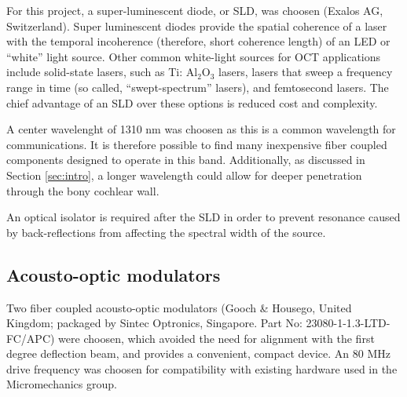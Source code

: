 For this project,  a super-luminescent diode, or SLD, was choosen (Exalos AG, Switzerland). Super luminescent diodes provide the spatial coherence of a laser with the temporal incoherence (therefore, short coherence length) of an LED or ``white'' light source. Other common white-light sources for OCT applications include solid-state lasers, such as Ti: Al$_2$O$_3$ lasers, lasers that sweep a frequency range in time (so called, ``swept-spectrum'' lasers), and femtosecond lasers. The chief advantage of an SLD over these options is reduced cost and complexity. \cite{bouma}

A center wavelenght of 1310 nm was choosen as this is a common wavelength for communications. It is therefore possible to find many inexpensive fiber coupled components designed to operate in this band. Additionally, as discussed in Section \ref{sec:intro}, a longer wavelength could allow for deeper penetration through the bony cochlear wall. \cite{Sandell2011} \cite{Bashkatov2006}

An optical isolator is required after the SLD in order to prevent resonance caused by back-reflections from affecting the spectral width of the source.


\subsection{Acousto-optic modulators}

Two fiber coupled acousto-optic modulators (Gooch \& Housego, United Kingdom; packaged by Sintec Optronics, Singapore. Part No: 23080-1-1.3-LTD-FC/APC) were choosen, which avoided the need for alignment with the first degree deflection beam, and provides a convenient, compact device. An 80 MHz drive frequency was choosen for compatibility with existing hardware used in the Micromechanics group. %

